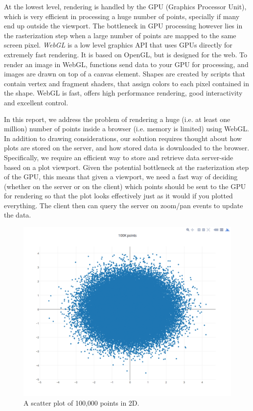 \documentclass[11pt,a4paper]{article}
\begin{document}
At the lowest level, rendering is handled by the GPU (Graphics Processor Unit), which is very efficient
in processing a huge number of points, specially if many end up outside the viewport. 
The bottleneck in GPU processing however lies in the rasterization step when a large number of points
are mapped to the same screen pixel. 
\emph{WebGL} is a low level graphics API that uses GPUs directly for extremely fast rendering. 
It is based on OpenGL, but is designed for the web. 
To render an image in WebGL, functions send data to your GPU for processing, 
and images are drawn on top of a canvas element. Shapes are created by scripts that contain 
vertex and fragment shaders, that assign colors to each pixel contained in the shape.
WebGL is fast, offers high performance rendering, good interactivity and excellent control. 


In this report, we address the problem of rendering a huge (i.e. at least one million) number of points
inside a browser (i.e. memory is limited) using WebGL.
%
In addition to drawing considerations, our solution requires thought about how plots are stored on the server, 
and how stored data is downloaded to the browser. 
Specifically, we require an efficient way to store and retrieve data server-side based on a plot viewport.
Given the potential bottleneck at the rasterization step of the GPU, this means that given a viewport, 
we need a fast way of deciding (whether on the server or on the client) which points should be sent to the GPU for rendering 
so that the plot looks effectively just as it would if you plotted everything.
The client then can query the server on zoom/pan events to update the data. 
%
\begin{figure}[t]
  \begin{center}
    \includegraphics[scale=0.2]{scatter.png}
    \caption{A scatter plot of 100,000 points in 2D.}
    \label{scatter}
  \end{center}
\end{figure}
\end{document}
